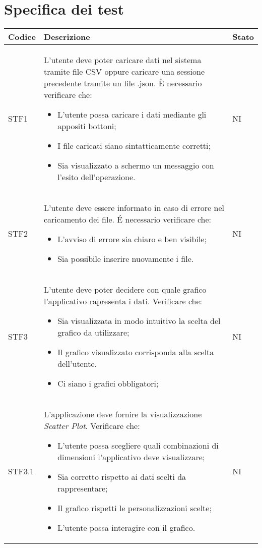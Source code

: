 \section{Specifica dei test}
    \begin{longtable}{|p{1.5cm}|p{11cm}|p{1cm}|} \hline
      \textbf{Codice} & \textbf{Descrizione} & \textbf{Stato} \\ \hline
        STF1 & L'utente deve poter caricare dati nel sistema tramite file CSV oppure caricare una sessione precedente tramite un file .json. \`E necessario verificare che: \begin{itemize}
            \item L'utente possa caricare i dati mediante gli appositi bottoni;
            \item I file caricati siano sintatticamente corretti;
            \item Sia visualizzato a schermo un messaggio con l'esito dell'operazione.
        \end{itemize} & NI\\ \hline

        STF2 & L'utente deve essere informato in caso di errore nel caricamento dei file. \'E necessario verificare che: \begin{itemize}
            \item L'avviso di errore sia chiaro e ben visibile;
            \item Sia possibile inserire nuovamente i file.
        \end{itemize} & NI\\ \hline

        STF3 & L'utente deve poter decidere con quale grafico l'applicativo rapresenta i dati. Verificare che: \begin{itemize}
            \item Sia visualizzata in modo intuitivo la scelta del grafico da utilizzare;
            \item Il grafico visualizzato corrisponda alla scelta dell'utente.
            \item Ci siano i grafici obbligatori;
        \end{itemize} & NI\\ \hline

        STF3.1 & L'applicazione deve fornire la visualizzazione  \textit{Scatter Plot}. Verificare che: \begin{itemize}
            \item L'utente possa scegliere quali combinazioni di dimensioni l'applicativo deve visualizzare;
            \item Sia corretto rispetto ai dati scelti da rappresentare;
            \item Il grafico rispetti le personalizzazioni scelte;
            \item L'utente possa interagire con il grafico.
        \end{itemize} & NI\\ \hline


\end{longtable}
